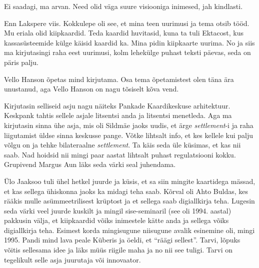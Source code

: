 Ei saadagi, ma arvan. Need olid väga suure visiooniga inimesed, jah kindlasti. 


Enn Lakspere viis. Kokkulepe oli see, et  mina teen uurimusi ja tema otsib 
tööd. Mu eriala olid kiipkaardid. Teda kaardid huvitasid, kuna ta tuli 
Ektacost, kus kassasüsteemide külge käisid kaardid ka. Mina pidin  kiipkaarte 
uurima. No ja siis ma 
kirjutasingi raha eest uurimusi, kolm lehekülge puhast teksti 
päevas, seda on päris palju.

Vello Hanson õpetas mind kirjutama. Osa tema 
õpetamistest olen täna ära unustanud, aga Vello Hanson on nagu tõsiselt kõva 
vend. 

Kirjutasin selliseid asju nagu näiteks Pankade Kaardikeskuse arhitektuur. Keskpank tahtis sellele asjale litsentsi anda ja 
litsentsi menetleda. Aga ma kirjutasin sinna  ühe asja, mis oli 
Sildmäe jaoks uudis, et ärge \emph{settlement}-i ja 
raha liigutamist üldse sinna 
keskusse pange. Võtke lihtsalt info, et kes kellele kui palju võlgu on ja tehke 
bilateraalne \emph{settlement}. Ta käis seda üle küsimas, et 
kas nii saab. Nad hoidsid nii mingi paar aastat  
lihtsalt puhast regulatsiooni kokku. Grupivend Margus Aun 
läks seda värki seal juhendama. 

Ülo Jaaksoo tuli  ühel hetkel juurde ja küsis, et sa siin mingite 
kaartidega mässad, et  kas sellega ühiskonna jaoks ka midagi teha saab. Kõrval 
oli Ahto Buldas, kes rääkis mulle asümmeetrilisest 
krüptost ja et sellega saab digiallkirja teha. Lugesin seda värki veel juurde 
kuskilt ja mingil sise-seminaril (see oli 1994. aastal) pakkusin välja, et 
kiipkaardid võiks inimestele kätte anda ja sellega võiks digiallkirja teha. 
Esimest korda mingisugune niisugune avalik esinemine oli, mingi 1995. Pandi 
mind lava peale Küberis ja öeldi, et \enquote{räägi sellest}. 
Tarvi, lõpuks võitis sellesama idee ja läks müüs 
riigile maha ja no nii see tuligi. Tarvi on tegelikult selle asja juurutaja 
või innovaator.

                 
